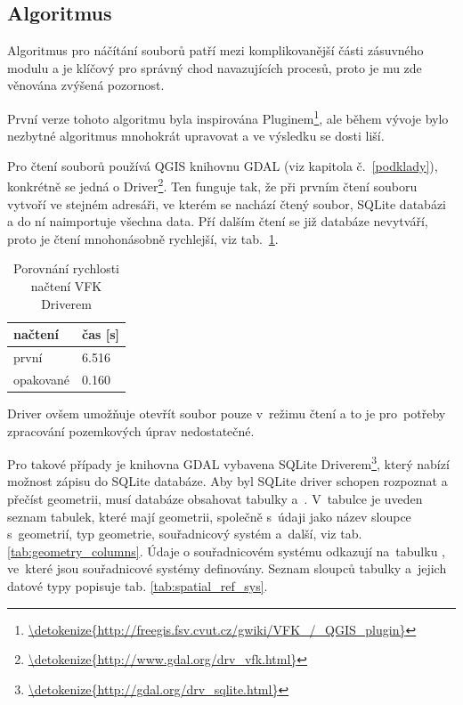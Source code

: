\subsection{Algoritmus}
\label{nacteni_vfk_algoritmus}

Algoritmus pro náčítání  souborů patří mezi komplikovanější části zásuvného modulu a je klíčový pro správný chod navazujících procesů, proto je mu zde věnována zvýšená pozornost.

První verze tohoto algoritmu byla inspirována  Pluginem\footnote{\url{\detokenize{http://freegis.fsv.cvut.cz/gwiki/VFK_/_QGIS_plugin}}}, ale během vývoje bylo nezbytné algoritmus mnohokrát upravovat a ve výsledku se dosti liší.

Pro čtení  souborů používá QGIS knihovnu GDAL (viz kapitola č.~\ref{podklady}), konkrétně se jedná o  Driver\footnote{\url{\detokenize{http://www.gdal.org/drv_vfk.html}}}. Ten funguje tak, že při prvním čtení souboru vytvoří ve stejném adresáři, ve kterém se nachází čtený  soubor, SQLite databázi a do ní naimportuje všechna data. Pří dalším čtení se již databáze nevytváří, proto je čtení mnohonásobně rychlejší, viz tab.~\ref{tab:nacteni_vfk_driver}. 

\begin{table}[H]
    \begin{tabular}{|l|l|}
        \hline
         načtení & čas [s] \\
        \hline
        \hline
         první & 6.516 \\ \hline
         opakované & 0.160 \\
         \hline
    \end{tabular}
    \centering
    \caption[Porovnání rychlosti načtení VFK Driverem]{Porovnání rychlosti načtení VFK Driverem}
    \label{tab:nacteni_vfk_driver}
\end{table}

 Driver ovšem umožňuje otevřít  soubor pouze v~režimu čtení a to je pro~potřeby zpracování pozemkových úprav nedostatečné.

Pro takové případy je knihovna GDAL vybavena SQLite Driverem\footnote{\url{\detokenize{http://gdal.org/drv_sqlite.html}}}, který nabízí možnost zápisu do SQLite databáze. Aby byl SQLite driver schopen rozpoznat a přečíst geometrii, musí databáze obsahovat tabulky \textit{} a~\textit{}. V~tabulce \textit{} je uveden seznam tabulek, které mají geometrii, společně s~údaji jako název sloupce s~geometrií, typ geometrie, souřadnicový systém a~další, viz tab. \ref{tab:geometry_columns}. Údaje o souřadnicovém systému odkazují na~tabulku \textit{}, ve~které jsou souřadnicové systémy definovány. Seznam sloupců tabulky \textit{} a~jejich datové typy popisuje tab. \ref{tab:spatial_ref_sys}. 

